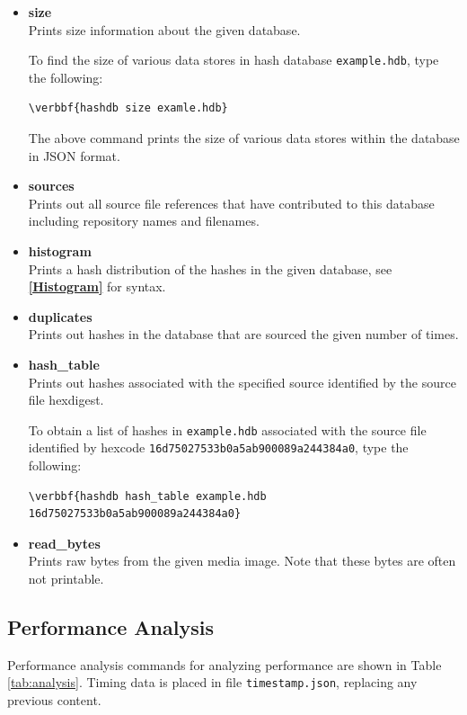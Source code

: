 \documentclass[11pt,fleqn]{article} %
\begin{document}
\begin{itemize}
\item \textbf{size}\\
Prints size information about the given database.

To find the size of various data stores in hash database \texttt{example.hdb},
type the following:
\begin{Verbatim}[commandchars=\\\{\}]
\verbbf{hashdb size examle.hdb}
\end{Verbatim}
The above command prints the size of various data stores within the database in JSON format.\\

\item \textbf{sources}\\
Prints out all source file references that have contributed to this database including repository names and filenames.
\item \textbf{histogram}\\
Prints a hash distribution of the hashes in the given database, see \textbf{\autoref{Histogram}} for syntax.
\item \textbf{duplicates}\\
Prints out hashes in the database that are sourced the given number of times.
\item \textbf{hash\_table}\\
Prints out hashes associated with the specified source identified by the source file hexdigest.

To obtain a list of hashes in \texttt{example.hdb} associated with the source file identified by hexcode \texttt{16d75027533b0a5ab900089a244384a0}, type the following:
\begin{Verbatim}[commandchars=\\\{\}]
\verbbf{hashdb hash_table example.hdb 16d75027533b0a5ab900089a244384a0}
\end{Verbatim}

\item \textbf{read\_bytes}\\
Prints raw bytes from the given media image. Note that these bytes are often not printable.
\end{itemize}

\subsection{Performance Analysis}
\label{PerformanceAnalysis}
Performance analysis commands for analyzing \hdb performance are shown in Table \ref{tab:analysis}. Timing data is placed in file \verb+timestamp.json+, replacing any previous content.
\end{document}
